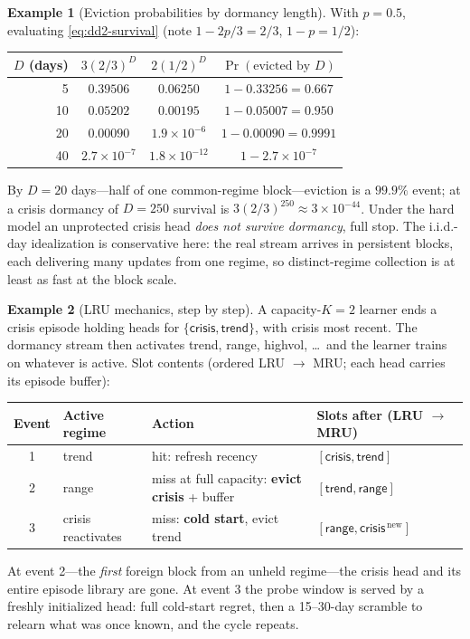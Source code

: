 \documentclass[11pt,a4paper]{article}
\theoremstyle{definition}
\newtheorem{example}{Example}[section]
\theoremstyle{plain}
\begin{document}
\begin{example}[Eviction probabilities by dormancy length]
With $p = 0.5$, evaluating \eqref{eq:dd2-survival} (note
$1 - 2p/3 = 2/3$, $1 - p = 1/2$):

\begin{center}
\begin{tabular}{rccc}
\toprule
$D$ (days) & $3(2/3)^D$ & $2(1/2)^D$ & $\Pr(\text{evicted by } D)$ \\
\midrule
5  & $0.39506$ & $0.06250$  & $1 - 0.33256 = 0.667$ \\
10 & $0.05202$ & $0.00195$  & $1 - 0.05007 = 0.950$ \\
20 & $0.00090$ & $1.9\times 10^{-6}$ & $1 - 0.00090 = 0.9991$ \\
40 & $2.7\times 10^{-7}$ & $1.8\times 10^{-12}$ & $1 - 2.7\times 10^{-7}$ \\
\bottomrule
\end{tabular}
\end{center}

By $D = 20$ days---half of one common-regime block---eviction is a $99.9\%$
event; at a crisis dormancy of $D = 250$ survival is
$3(2/3)^{250} \approx 3 \times 10^{-44}$. Under the hard model an
unprotected crisis head \emph{does not survive dormancy}, full stop. The
i.i.d.-day idealization is conservative here: the real stream arrives in
persistent blocks, each delivering many updates from one regime, so
distinct-regime collection is at least as fast at the block scale.
\end{example}

\begin{example}[LRU mechanics, step by step]
\label{ex:dd2-lru}
A capacity-$K{=}2$ learner ends a crisis episode holding heads for
$\{\textsf{crisis}, \textsf{trend}\}$, with \textsf{crisis} most recent.
The dormancy stream then activates \textsf{trend}, \textsf{range},
\textsf{highvol}, \ldots\ and the learner trains on whatever is active. Slot
contents (ordered LRU $\to$ MRU; each head carries its episode buffer):

\begin{center}
\begin{tabular}{clll}
\toprule
Event & Active regime & Action & Slots after (LRU $\to$ MRU) \\
\midrule
1 & \textsf{trend}   & hit: refresh recency & $[\textsf{crisis}, \textsf{trend}]$ \\
2 & \textsf{range}   & miss at full capacity: \textbf{evict \textsf{crisis}} + buffer & $[\textsf{trend}, \textsf{range}]$ \\
3 & \textsf{crisis} reactivates & miss: \textbf{cold start}, evict \textsf{trend} & $[\textsf{range}, \textsf{crisis}^{\,\text{new}}]$ \\
\bottomrule
\end{tabular}
\end{center}

At event 2---the \emph{first} foreign block from an unheld regime---the
crisis head and its entire episode library are gone. At event 3 the probe
window is served by a freshly initialized head: full cold-start regret, then
a 15--30-day scramble to relearn what was once known, and the cycle repeats.
\end{example}
\end{document}
